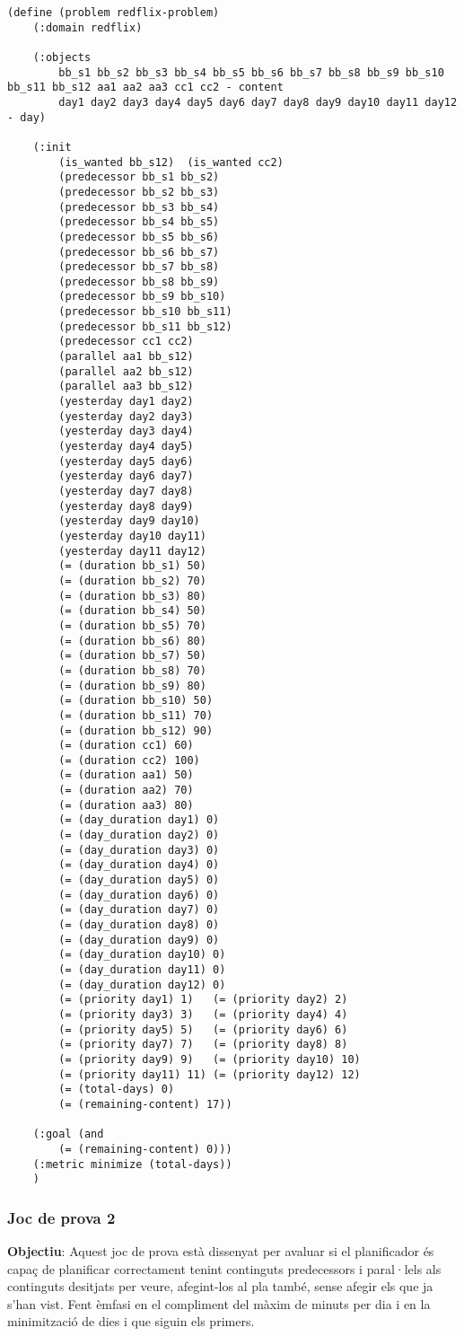 \documentclass[a4paper]{article}
\begin{document}
	\begin{lstlisting}[language=PDDL, caption={Joc de Prova 1 - Extensió 4
		}, label={lst:JP14}]                     
	(define (problem redflix-problem)
	(:domain redflix)
	
	(:objects
		bb_s1 bb_s2 bb_s3 bb_s4 bb_s5 bb_s6 bb_s7 bb_s8 bb_s9 bb_s10 bb_s11 bb_s12 aa1 aa2 aa3 cc1 cc2 - content
		day1 day2 day3 day4 day5 day6 day7 day8 day9 day10 day11 day12 - day)
	
	(:init
		(is_wanted bb_s12)	(is_wanted cc2)
		(predecessor bb_s1 bb_s2)
		(predecessor bb_s2 bb_s3)
		(predecessor bb_s3 bb_s4)
		(predecessor bb_s4 bb_s5)
		(predecessor bb_s5 bb_s6)
		(predecessor bb_s6 bb_s7)
		(predecessor bb_s7 bb_s8)
		(predecessor bb_s8 bb_s9)
		(predecessor bb_s9 bb_s10)
		(predecessor bb_s10 bb_s11)
		(predecessor bb_s11 bb_s12)
		(predecessor cc1 cc2)
		(parallel aa1 bb_s12)
		(parallel aa2 bb_s12)
		(parallel aa3 bb_s12)
		(yesterday day1 day2)
		(yesterday day2 day3)
		(yesterday day3 day4)
		(yesterday day4 day5)
		(yesterday day5 day6)
		(yesterday day6 day7)
		(yesterday day7 day8)
		(yesterday day8 day9)
		(yesterday day9 day10)
		(yesterday day10 day11)
		(yesterday day11 day12)
		(= (duration bb_s1) 50)
		(= (duration bb_s2) 70)
		(= (duration bb_s3) 80)
		(= (duration bb_s4) 50)
		(= (duration bb_s5) 70)
		(= (duration bb_s6) 80)
		(= (duration bb_s7) 50)
		(= (duration bb_s8) 70)
		(= (duration bb_s9) 80)
		(= (duration bb_s10) 50)
		(= (duration bb_s11) 70)
		(= (duration bb_s12) 90)
		(= (duration cc1) 60)
		(= (duration cc2) 100)
		(= (duration aa1) 50)
		(= (duration aa2) 70)
		(= (duration aa3) 80)
		(= (day_duration day1) 0)
		(= (day_duration day2) 0)
		(= (day_duration day3) 0)
		(= (day_duration day4) 0)
		(= (day_duration day5) 0)
		(= (day_duration day6) 0)
		(= (day_duration day7) 0)
		(= (day_duration day8) 0)
		(= (day_duration day9) 0)
		(= (day_duration day10) 0)
		(= (day_duration day11) 0)
		(= (day_duration day12) 0)
		(= (priority day1) 1)	(= (priority day2) 2)
		(= (priority day3) 3)   (= (priority day4) 4)
		(= (priority day5) 5)   (= (priority day6) 6)
		(= (priority day7) 7)   (= (priority day8) 8)
		(= (priority day9) 9)   (= (priority day10) 10)
		(= (priority day11) 11) (= (priority day12) 12)
		(= (total-days) 0)
		(= (remaining-content) 17))
	
	(:goal (and
		(= (remaining-content) 0)))
	(:metric minimize (total-days))
	)	
	\end{lstlisting}
	
	\subsubsection*{Joc de prova 2}
	\noindent \textbf{Objectiu}: Aquest joc de prova està dissenyat per avaluar si el planificador és capaç de planificar correctament tenint continguts predecessors i paral·lels als continguts desitjats per veure, afegint-los al pla també, sense afegir els que ja s'han vist. Fent èmfasi en el compliment del màxim de minuts per dia i en la minimització de dies i que siguin els primers. \\
	
\end{document}
